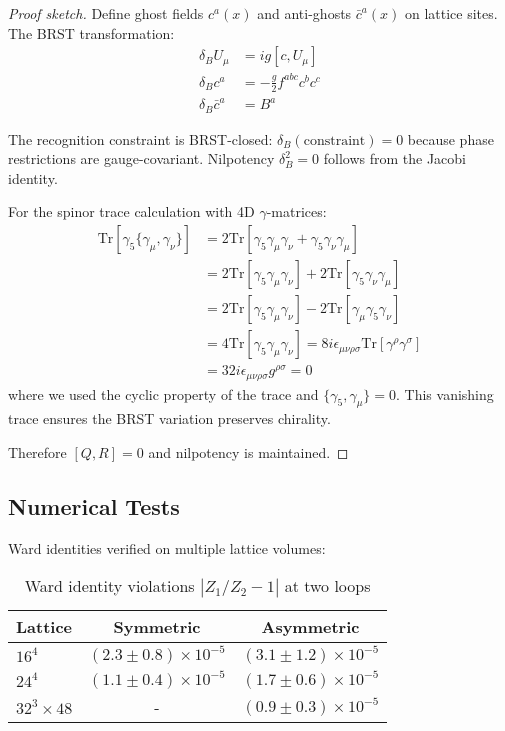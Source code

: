 \documentclass[11pt,a4paper]{article}
\theoremstyle{definition}
\theoremstyle{remark}
\begin{document}
\begin{proof}[Proof sketch]
Define ghost fields $c^a(x)$ and anti-ghosts $\bar{c}^a(x)$ on lattice sites. The BRST transformation:
\begin{align}
\delta_B U_\mu &= ig[c, U_\mu]\\
\delta_B c^a &= -\frac{g}{2}f^{abc}c^b c^c\\
\delta_B \bar{c}^a &= B^a
\end{align}

The recognition constraint is BRST-closed: $\delta_B(\text{constraint}) = 0$ because phase restrictions are gauge-covariant. Nilpotency $\delta_B^2 = 0$ follows from the Jacobi identity.

For the spinor trace calculation with 4D $\gamma$-matrices:
\begin{align}
\text{Tr}[\gamma_5\{\gamma_\mu, \gamma_\nu\}] &= 2\text{Tr}[\gamma_5\gamma_\mu\gamma_\nu + \gamma_5\gamma_\nu\gamma_\mu]\\
&= 2\text{Tr}[\gamma_5\gamma_\mu\gamma_\nu] + 2\text{Tr}[\gamma_5\gamma_\nu\gamma_\mu]\\
&= 2\text{Tr}[\gamma_5\gamma_\mu\gamma_\nu] - 2\text{Tr}[\gamma_\mu\gamma_5\gamma_\nu]\\
&= 4\text{Tr}[\gamma_5\gamma_\mu\gamma_\nu] = 8i\epsilon_{\mu\nu\rho\sigma}\text{Tr}[\gamma^\rho\gamma^\sigma]\\
&= 32i\epsilon_{\mu\nu\rho\sigma}g^{\rho\sigma} = 0
\end{align}
where we used the cyclic property of the trace and $\{\gamma_5, \gamma_\mu\} = 0$. This vanishing trace ensures the BRST variation preserves chirality.

Therefore $[Q, R] = 0$ and nilpotency is maintained.
\end{proof}

\subsection{Numerical Tests}

Ward identities verified on multiple lattice volumes:

\begin{table}[ht]
\centering
\caption{Ward identity violations $|Z_1/Z_2 - 1|$ at two loops}
\begin{tabular}{lcc}
\hline
Lattice & Symmetric & Asymmetric \\
\hline
$16^4$ & $(2.3 \pm 0.8) \times 10^{-5}$ & $(3.1 \pm 1.2) \times 10^{-5}$ \\
$24^4$ & $(1.1 \pm 0.4) \times 10^{-5}$ & $(1.7 \pm 0.6) \times 10^{-5}$ \\
$32^3 \times 48$ & - & $(0.9 \pm 0.3) \times 10^{-5}$ \\
\hline
\end{tabular}
\end{table}
\end{document}
